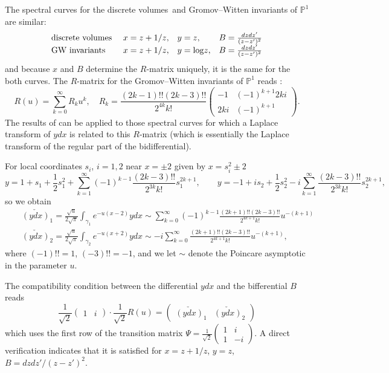 \documentclass[11pt]{article}
\def\be{\begin{equation}}
\def\ee{\end{equation}}
\def\bea{\begin{eqnarray}}
\def\eea{\end{eqnarray}}
\def\1N{${\cal N}=1$}
\newcommand{\bp}{\mathbb{P}}
\def\bea{\begin{eqnarray}}
\def\eea{\end{eqnarray}}
\theoremstyle{plain}
\theoremstyle{definition}
\let\operatorname=\mathrm
\def\ln{\operatorname{log}}
\def\bea{\begin{eqnarray}}
\def\eea{\end{eqnarray}}
\newcommand {\dvol}{discrete volumes}%
\begin{document}
The spectral curves for the \dvol\  and Gromov--Witten invariants of $\bp^1$ are similar:
\be
\begin{array}{llll}
\hbox{\dvol\ } & x=z+1/z, & y=z, & B=\frac{dzdz'}{(z-z')^2}\cr
\hbox{GW invariants} & x=z+1/z, & y=\ln{z}, & B=\frac{dzdz'}{(z-z')^2}
\end{array}
\label{vol-GW}
\ee
and because $x$ and $B$ determine the $R$-matrix uniquely, it is the same for the both curves.  The $R$-matrix for the 
Gromov--Witten invariants of $\bp^1$ reads \cite{DOSSIde}:
$$
R(u)=\sum_{k=0}^{\infty}R_ku^k,\quad R_k=\frac{(2k-1)!!(2k-3)!!}{2^{4k}k!}
\left(\begin{array}{cc}-1&(-1)^{k+1}2ki\\2ki&(-1)^{k+1}\end{array}\right).
$$
The results of \cite{DOSSIde} can be applied to those spectral curves for which a Laplace transform of $ydx$ is related to this $R$-matrix (which is essentially the Laplace transform of the regular part of the bidifferential).

For local coordinates $s_i$, $i=1,2$ near $x=\pm 2$ given by $x=s_i^2\pm 2$ 
$$ y= 1+s_1+\frac{1}{2}s_1^2+\sum_{k=1}^{\infty}(-1)^{k-1}\frac{(2k-3)!!}{2^{3k}k!}s_1^{2k+1},\qquad
y= -1+is_2+\frac{1}{2}s_2^2-i\sum_{k=1}^{\infty}\frac{(2k-3)!!}{2^{3k}k!}s_2^{2k+1},$$
so we obtain
\bea
&{}&
\check{(ydx)}_1
=\frac{\sqrt{u}}{2\sqrt{\pi}}\int_{\gamma_1} e^{-u(x-2)}ydx\sim\sum_{k=0}^{\infty}(-1)^{k-1}\frac{(2k+1)!!(2k-3)!!}{2^{4k+1}k!}u^{-(k+1)}
\nonumber\\
&{}&\check{(ydx)}_2
=\frac{\sqrt{u}}{2\sqrt{\pi}}\int_{\gamma_2} e^{-u(x+2)}ydx\sim-i\sum_{k=0}^{\infty}\frac{(2k+1)!!(2k-3)!!}{2^{4k+1}k!}u^{-(k+1)},
\nonumber
\eea
where $(-1)!!=1$, $(-3)!!=-1$, and we let $\sim$ denote the Poincare asymptotic in the parameter $u$.


The compatibility condition between the differential $ydx$ and the bifferential $B$ reads
\begin{equation}  \label{compatible}
\frac{1}{\sqrt{2}}\left(\begin{array}{cc}1&i\end{array}\right)\cdot\frac{1}{\sqrt{2}}R(u)=\left(\begin{array}{cc}\check{(ydx)}_1&\check{(ydx)}_2\end{array}\right)
\end{equation}
which uses the first row of the transition matrix $\Psi=\frac{1}{\sqrt{2}}\left(\begin{array}{cc}1&i\\1&-i\end{array}\right)$.
A direct verification indicates that it is satisfied for $x=z+1/z$, $y=z$, $B=dzdz'/(z-z')^2$.
\end{document}
